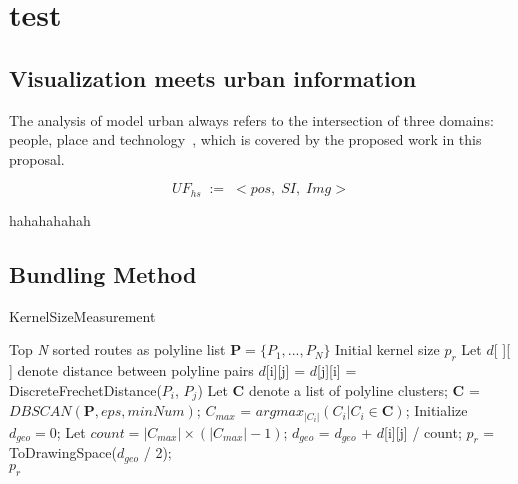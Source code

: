 \chapter{test}


\section{Visualization meets urban information}

 
The analysis of model urban always refers to the intersection of three domains: people, place and technology~\cite{foth2011urban}, which is covered by the proposed work in this proposal. 

\vspace*{-2mm}
\begin{equation}
\label{c1_eq_sv}
UF_{hs} \; := \; <pos, \; SI, \; Img>
\end{equation}


hahahahahah
\section{Bundling Method}
\label{sec:bundling}
\begin{algorithm}[h]
	\caption{KernelSizeMeasurement}\label{al:kernel_size_measurement}
	\begin{algorithmic}[1]
		\Require Top \textit{N} sorted routes as polyline list $\textbf{P} = \{P_1, ..., P_N\}$
		\Ensure Initial kernel size $p_r$		
		\State Let $d$[ ][ ] denote distance between polyline pairs
		\State $d$[i][j] = $d$[j][i] = DiscreteFrechetDistance($P_i$, $P_j$)
		\EndFor
		\EndFor
		\State Let \textbf{C} denote a list of polyline clusters;
		\State \textbf{C} = $DBSCAN(\textbf{P}, eps, minNum)$;
		\State $C_{max}$ = $argmax_{|C_i|}(C_i | C_i \in \textbf{C})$;
		\State Initialize $d_{geo} = 0$;
		\State Let $count = |C_{max}| \times (|C_{max}| - 1)$;
		\State $d_{geo}$ = $d_{geo}$ + $d$[i][j] / count;
		\EndFor
		\EndFor
		\State $p_r$ = ToDrawingSpace($d_{geo}$ / 2); \\
		\Return $p_r$
	\end{algorithmic}
\end{algorithm}